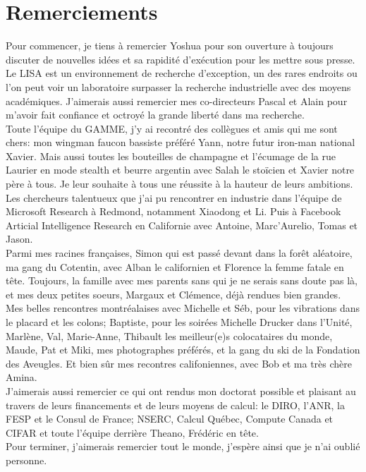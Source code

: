 \chapter*{Remerciements}
\vspace{-0.5cm}
Pour commencer, je tiens à remercier Yoshua pour son ouverture à toujours
discuter de nouvelles idées et sa rapidité d'exécution pour les mettre sous
presse. Le LISA est un environnement de recherche d'exception, un des rares
endroits ou l'on peut voir un laboratoire surpasser la recherche industrielle
avec des moyens académiques. J'aimerais aussi remercier mes co-directeurs Pascal
et Alain pour m'avoir fait confiance et octroyé la grande liberté dans ma
recherche.
\\

\vspace{-0.1cm}
Toute l'équipe du GAMME, j'y ai recontré des collègues et amis qui me sont
chers: mon wingman faucon bassiste préféré Yann, notre futur iron-man national
Xavier. Mais aussi toutes les bouteilles de champagne et l'écumage de la rue
Laurier en mode stealth et beurre argentin avec Salah le stoïcien et Xavier
notre père à tous.  Je leur souhaite à tous une réussite à la hauteur de leurs
ambitions.
\\

\vspace{-0.1cm}
Les chercheurs talentueux que j'ai pu rencontrer en industrie dans l'équipe de
Microsoft Research à Redmond, notamment Xiaodong et Li. Puis à Facebook
Articial Intelligence Research en Californie avec Antoine, Marc'Aurelio, Tomas
et Jason.
\\

\vspace{-0.1cm}
Parmi mes racines françaises, Simon qui est passé devant dans la forêt
aléatoire, ma gang du Cotentin, avec Alban le californien et Florence la femme
fatale en tête. Toujours, la famille avec mes parents sans qui je ne serais sans
doute pas là, et mes deux petites soeurs, Margaux et Clémence, déjà rendues bien grandes.
\\

\vspace{-0.1cm}
Mes belles rencontres montréalaises avec Michelle et Séb, pour les vibrations
dans le placard et les colons; Baptiste, pour les soirées Michelle Drucker
dans l'Unité, Marlène, Val, Marie-Anne, Thibault les meilleur(e)s
colocataires du monde, Maude, Pat et Miki, mes photographes préférés, et la
gang du ski de la Fondation des Aveugles. Et bien sûr mes recontres
califoniennes, avec Bob et ma très chère Amina.
\\

\vspace{-0.1cm}
J'aimerais aussi remercier ce qui ont rendus mon doctorat possible et plaisant
au travers de leurs financements et de leurs moyens de calcul: le DIRO, l'ANR,
la FESP et le Consul de France; NSERC, Calcul Québec, Compute Canada et CIFAR
et toute l'équipe derrière Theano, Frédéric en tête. 
\\

\vspace{-0.1cm}
Pour terminer, j'aimerais remercier tout le monde, j'espère ainsi que je n'ai
oublié personne.
